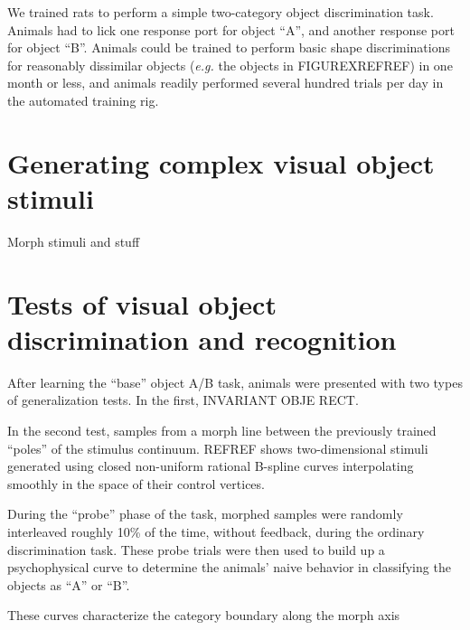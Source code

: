 We trained rats to perform a simple two-category object discrimination task. Animals had to lick one response port for object ``A'', and another response port for object ``B''.  Animals could be trained to perform basic shape discriminations for reasonably dissimilar objects (\textit{e.g.} the objects in FIGUREXREFREF) in one month or less, and animals readily performed several hundred trials per day in the automated training rig. 

\section{Generating complex visual object stimuli}
Morph stimuli and stuff


\section{Tests of visual object discrimination and recognition}

After learning the ``base'' object A/B task, animals were presented with two types of generalization tests. In the first, INVARIANT OBJE RECT.

In the second test, samples from a morph line between the previously trained ``poles'' of the stimulus continuum. REFREF shows two-dimensional stimuli generated using closed non-uniform rational B-spline curves interpolating smoothly in the space of their control vertices. 

During the ``probe'' phase of the task, morphed samples were randomly interleaved roughly 10\% of the time, without feedback, during the ordinary discrimination task. These probe trials were then used to build up a psychophysical curve to determine the animals' naive behavior in classifying the objects as ``A'' or ``B''. 

These curves characterize the category boundary along the morph axis 


